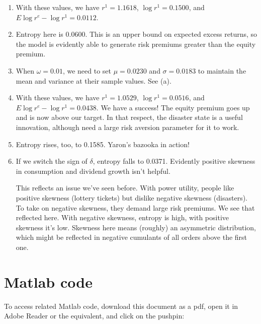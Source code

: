 \documentclass[11pt]{article}
\begin{document}
\begin{enumerate}
\begin{enumerate}
\item With these values, we have
$r^1 = 1.1618$, $\log r^1 = 0.1500$, and
$E \log r^e - \log r^1 = 0.0112 $.

\item Entropy here is 0.0600.
This is an upper bound on expected excess returns,
so the model is evidently able to generate risk premiums greater than the equity premium.

\item When $\omega = 0.01$,
we need to set $\mu = 0.0230$ and $\sigma = 0.0183$ to maintain the mean and
variance at their sample values.
See (a).

\item With these values, we have
$r^1 = 1.0529$, $\log r^1 = 0.0516$, and
$E \log r^e - \log r^1 = 0.0438 $.
We have a success!
The equity premium goes up and is now above our target.
In that respect, the disaster state is a useful innovation,
although need a large risk aversion parameter for it to work.

\item Entropy rises, too, to 0.1585.  Yaron's bazooka in action!

\item If we switch the sign of $\delta$,
entropy falls to 0.0371.
Evidently positive skewness in consumption and dividend growth
isn't helpful.

This reflects an issue we've seen before.  With power utility,
people like positive skewness (lottery tickets)
but dislike negative skewness (disasters).
To take on negative skewness, they demand large risk premiums.
We see that reflected here.
With negative skewness, entropy is high, with positive skewness
it's low.
Skewness here means (roughly) an asymmetric distribution,
which might be reflected in negative cumulants of all orders above the first one.
\end{enumerate}

\end{enumerate}

\section*{Matlab code}

To access related Matlab code, download this document as a pdf, open it in Adobe Reader or the equivalent, and click on the pushpin:
\end{document}

